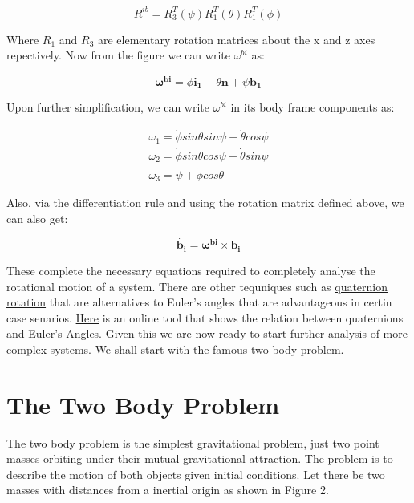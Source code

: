 \documentclass[12pt, letterpaper]{article}
\begin{document}
\begin{displaymath}
R^{ib} = R_3^{T}(\psi)R_1^{T}(\theta)R_1^{T}(\phi)
\end{displaymath}

Where $R_1$ and $R_3$ are elementary rotation matrices about the x and z axes repectively. Now from the figure we can write $\omega^{bi}$ as:

\begin{displaymath}
\mathbf{\omega^{bi}} = \dot{\phi}\mathbf{i_1} + \dot{\theta}\mathbf{n} + \dot{\psi}\mathbf{b_1}
\end{displaymath}

Upon further simplification, we can write $\omega^{bi}$ in its body frame components as:

\begin{gather*}
\omega_1 = \dot{\phi}sin{\theta}sin{\psi} + \dot{\theta}cos\psi\\
\omega_2 = \dot{\phi}sin{\theta}cos{\psi} - \dot{\theta}sin\psi\\
\omega_3 = \dot{\psi} + \dot{\phi}cos\theta
\end{gather*}

Also, via the differentiation rule and using the rotation matrix defined above, we can also get:

\begin{displaymath}
\dot{\mathbf{b_i}} = \mathbf{\omega^{bi}}\times\mathbf{b_i}
\end{displaymath}

These complete the necessary equations required to completely analyse the rotational motion of a system. There are other tequniques such as \href{https://en.wikipedia.org/wiki/Quaternion}{quaternion rotation} that are alternatives to Euler's angles that are advantageous in certin case senarios. \href{https://quaternions.online}{Here} is an online tool that shows the relation between quaternions and Euler's Angles. Given this we are now ready to start further analysis of more complex systems. We shall start with the famous two body problem.

\newpage
\section{The Two Body Problem}
 The two body problem is the simplest gravitational problem, just two point masses orbiting under their mutual gravitational attraction. The problem is to describe the motion of both objects given initial conditions. Let there be two masses with distances from a inertial origin as shown in Figure 2.
\end{document}

